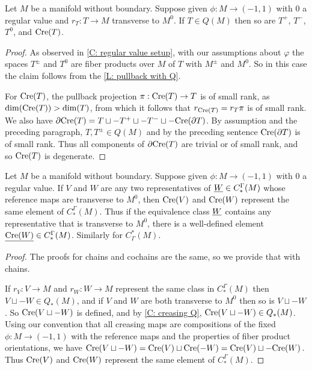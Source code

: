 \begin{corollary}\label{C: creasing Q}
Let $M$ be a manifold without boundary. Suppose given $\phi:M \to (-1,1)$ with $0$ a regular value and $r_T:T \to M$ transverse to $M^0$. If $T \in Q(M)$ then so are $T^+$, $T^-$, $T^0$, and $\mathrm{Cre}(T)$.
\end{corollary}
\begin{proof}
As observed in \cref{C: regular value setup}, with our assumptions about $\varphi$ the spaces $T^\pm$ and $T^0$ are fiber products over $M$ of $T$ with $M^\pm$ and $M^0$. So in this case the claim follows from the \cref{L: pullback with Q}.

For $\mathrm{Cre}(T)$, the pullback projection $\pi:\mathrm{Cre}(T) \to T$ is of small rank, as $\dim(\mathrm{Cre}(T))>\dim(T)$, from which it follows that $r_{\mathrm{Cre}(T)} = r_T\pi$ is of small rank. We also have $\partial \mathrm{Cre}(T) = T\sqcup - T^+\sqcup -T^-\sqcup -\mathrm{Cre}(\partial T)$. By assumption and the preceding paragraph, $T, T^\pm \in Q(M)$ and by the preceding sentence $\mathrm{Cre}(\partial T)$ is of small rank. Thus all components of $\partial \mathrm{Cre}(T)$ are trivial or of small rank, and so $\mathrm{Cre}(T)$ is degenerate.
\end{proof}

\begin{proposition}
Let $M$ be a manifold without boundary. Suppose given $\phi:M \to (-1,1)$ with $0$ a regular value. If $V$ and $W$ are any two representatives of $\underline{W} \in C_*^\Gamma(M)$ whose reference maps are transverse to $M^0$, then $\mathrm{Cre}(V)$ and $\mathrm{Cre}(W)$ represent the same element of $C_*^\Gamma(M)$. Thus if the equivalence class $\underline{W}$ contains any representative that is transverse to $M^0$, there is a well-defined element $\underline{\mathrm{Cre}(W)} \in C_*^\Gamma(M)$. Similarly for $C^*_\Gamma(M)$.
\end{proposition}
\begin{proof}
The proofs for chains and cochains are the same, so we provide that with chains.

If $r_V:V \to M$ and $r_W \colon W \to M$ represent the same class in $C_*^\Gamma(M)$ then $V\sqcup -W \in Q_*(M)$, and if $V$ and $W$ are both transverse to $M^0$ then so is $V\sqcup -W$. So $\mathrm{Cre}(V\sqcup-W)$ is defined, and by \cref{C: creasing Q}, $\mathrm{Cre}(V\sqcup -W) \in Q_*(M)$. Using our convention that all creasing maps are compositions of the fixed $\phi:M \to (-1,1)$ with the reference maps and the properties of fiber product orientations, we have $\mathrm{Cre}(V\sqcup -W) = \mathrm{Cre}(V)\sqcup \mathrm{Cre}(-W) = \mathrm{Cre}(V)\sqcup -\mathrm{Cre}(W)$. Thus $\mathrm{Cre}(V)$ and $\mathrm{Cre}(W)$ represent the same element of $C_*^\Gamma(M)$.
\end{proof}

